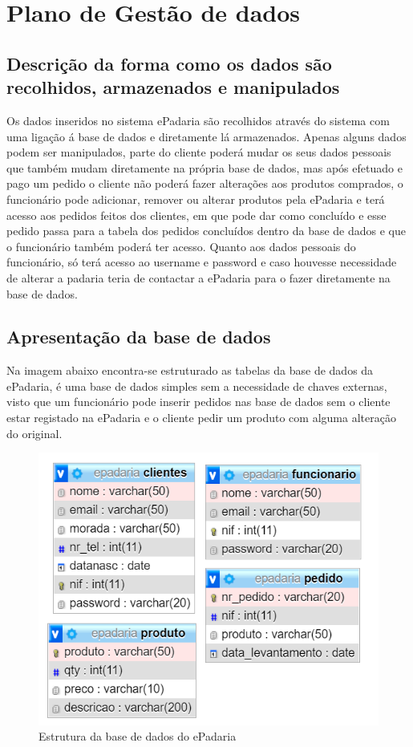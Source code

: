 \chapter{Plano de Gestão de dados}
\label{plano_de_gestao_de_dados}
\section{Descrição da forma como os dados são recolhidos, armazenados e manipulados}
Os dados inseridos no sistema ePadaria são recolhidos através do sistema com uma ligação á base de dados e diretamente lá armazenados. Apenas alguns dados podem ser manipulados, parte do cliente poderá mudar os seus dados pessoais que também mudam diretamente na própria base de dados, mas após efetuado e pago um pedido o cliente não poderá fazer alterações aos produtos comprados, o funcionário pode adicionar, remover ou alterar produtos pela ePadaria e terá acesso aos pedidos feitos dos clientes, em que pode dar como concluído e esse pedido passa para a tabela dos pedidos concluídos dentro da base de dados e que o funcionário também poderá ter acesso. Quanto aos dados pessoais do funcionário, só terá acesso ao username e password e caso houvesse necessidade de alterar a padaria teria de contactar a ePadaria para o fazer diretamente na base de dados.

\section{Apresentação da base de dados}

Na imagem abaixo encontra-se estruturado as tabelas da base de dados da ePadaria, é uma base de dados simples sem a necessidade de chaves externas, visto que um funcionário pode inserir pedidos nas base de dados sem o cliente estar registado na ePadaria e o cliente pedir um produto com alguma alteração do original.

\begin{figure}[H]
	\centering
	\includegraphics{bd}
	\caption{Estrutura da base de dados do ePadaria}
	\label{fig:bd}
\end{figure}

